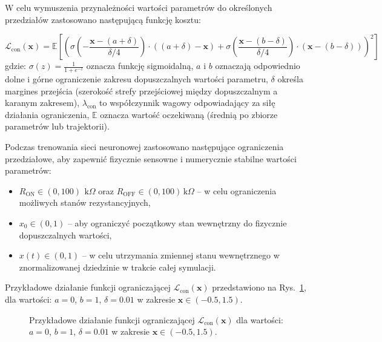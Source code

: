 \documentclass[11pt, oneside]{article}
\begin{document}
W celu wymuszenia przynależności wartości parametrów do określonych przedziałów zastosowano następującą funkcję kosztu:

\begin{equation}
    \mathcal{L}_{\mathrm{con}}(\mathbf{x}) =  \mathbb{E}\left[\left(
        \sigma\left(-\frac{\mathbf{x} - (a + \delta)}{\delta/4}\right) \cdot ((a + \delta) - \mathbf{x}) +
        \sigma\left(\frac{\mathbf{x} - (b - \delta)}{\delta/4}\right) \cdot (\mathbf{x} - (b - \delta))
        \right)^2\right]
\end{equation}
gdzie: $\sigma(z) = \frac{1}{1 + e^{-z}}$ oznacza funkcję sigmoidalną,
$a$ i $b$ oznaczają odpowiednio dolne i górne ograniczenie zakresu dopuszczalnych wartości parametru,
$\delta$ określa margines przejścia (szerokość strefy przejściowej między dopuszczalnym a karanym zakresem),
$\lambda_{\mathrm{con}}$ to współczynnik wagowy odpowiadający za siłę działania ograniczenia,
$\mathbb{E}$ oznacza wartość oczekiwaną (średnią po zbiorze parametrów lub trajektorii).

Podczas trenowania sieci neuronowej zastosowano następujące ograniczenia przedziałowe, aby zapewnić fizycznie sensowne i numerycznie stabilne wartości parametrów:
\begin{itemize}
    \item $R_{\mathrm{ON}} \in (0, 100)\,\ \mathrm{k}\Omega$ oraz $R_{\mathrm{OFF}} \in (0, 100)\,\mathrm{k}\Omega$ – w celu ograniczenia możliwych stanów rezystancyjnych,
    \item $x_0 \in (0, 1)$ – aby ograniczyć początkowy stan wewnętrzny do fizycznie dopuszczalnych wartości,
    \item $x(t) \in (0, 1)$ – w celu utrzymania zmiennej stanu wewnętrznego w znormalizowanej dziedzinie w trakcie całej symulacji.
\end{itemize}

Przykładowe działanie funkcji ograniczającej $\mathcal{L}_{\mathrm{con}}(\mathbf{x})$ przedstawiono na Rys.~\ref{fig:constrains}, dla wartości:  $a=0$, $b=1$, $\delta=0.01$ w zakresie $\mathbf{x} \in (-0.5, 1.5)$.

\begin{figure}[H]
    \centering
    \resizebox{0.5\linewidth}{!}{%
        
    }
    \caption{Przykładowe działanie funkcji ograniczającej $\mathcal{L}_{\mathrm{con}}(\mathbf{x})$ dla wartości:  $a=0$, $b=1$, $\delta=0.01$ w zakresie $\mathbf{x} \in (-0.5, 1.5)$.}
    \label{fig:constrains}
\end{figure}
\end{document}
